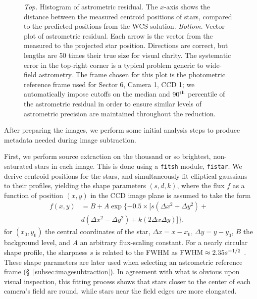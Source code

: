 \documentclass[12pt,twocolumn,tighten]{aastex62}
\begin{document}
\begin{figure}[!t]
	\vspace{-0.8cm}
	\vspace{-0.8cm}
    \caption{
		{\it Top.} Histogram of astrometric residual. The $x$-axis shows 
		the distance between the measured centroid positions of stars, 
		compared to the predicted positions from the WCS solution.
    {\it Bottom.} Vector plot of astrometric residual. Each arrow is
    the vector from the measured to the projected star position.
    Directions are correct, but lengths are 50 times their true size
    for visual clarity.  The systematic error in the top-right
    corner is a typical problem generic to wide-field astrometry.  The
    frame chosen for this plot is the photometric reference frame used
    for Sector 6, Camera 1, CCD 1; we automatically impose cutoffs on
    the median and $90^{\rm th}$ percentile of the astrometric
    residual in order to ensure similar levels of astrometric
    precision are maintained throughout the reduction.
	}
	\label{fig:astromresid}
\end{figure}

After preparing the images, we perform some initial analysis steps to
produce metadata needed during image subtraction.  

First, we perform source extraction on the thousand or so brightest,
non-saturated stars in each image.  This is done using a
\texttt{fitsh} module, \texttt{fistar}.  We derive centroid positions
for the stars, and simultaneously fit elliptical gaussians to their
profiles, yielding the shape parameters $(s,d,k)$, where the flux $f$
as a function of position $(x,y)$ in the CCD image plane is assumed to
take the form
\begin{align}
  f(x,y) &= B + A \exp \{ -0.5 \times [
    s(\Delta x^2 + \Delta y^2) + \\
    \nonumber
    &d(\Delta x^2 - \Delta y^2) +
    k(2\Delta x \Delta y)
  ]  \},
\end{align}
for $(x_0,y_0)$ the central coordinates of the star, $\Delta x =
x-x_0$, $\Delta y = y - y_0$, $B$ the background level, and $A$ an
arbitrary flux-scaling constant.  For a nearly circular shape profile,
the sharpness $s$ is related to the FWHM as ${\rm FWHM} \approx
2.35s^{-1/2}$ \citep[{\it e.g.},][]{Pal_2009}.  These shape parameters
are later used when selecting an astrometric reference frame
(\S~\ref{subsec:imagesubtraction}).  In agreement with what is obvious
upon visual inspection, this fitting process shows that stars closer
to the center of each camera's field are round, while stars near the
field edges are more elongated.
\end{document}
